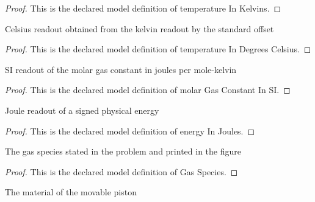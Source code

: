\begin{proof}
  This is the declared model definition of temperature In Kelvins.
\end{proof}
\begin{definition}
  \label{def:physics:phyx-mini-0407:phyxminiproblems-problemphyxmini0407-temperatureindegreescelsius}
  Celsius readout obtained from the kelvin readout by the standard offset
\end{definition}
\begin{proof}
  This is the declared model definition of temperature In Degrees Celsius.
\end{proof}
\begin{definition}
  \label{def:physics:phyx-mini-0407:phyxminiproblems-problemphyxmini0407-molargasconstantinsi}
  SI readout of the molar gas constant in joules per mole-kelvin
\end{definition}
\begin{proof}
  This is the declared model definition of molar Gas Constant In SI.
\end{proof}
\begin{definition}
  \label{def:physics:phyx-mini-0407:phyxminiproblems-problemphyxmini0407-energyinjoules}
  Joule readout of a signed physical energy
\end{definition}
\begin{proof}
  This is the declared model definition of energy In Joules.
\end{proof}
\begin{definition}
  \label{def:physics:phyx-mini-0407:phyxminiproblems-problemphyxmini0407-gasspecies}
  The gas species stated in the problem and printed in the figure
\end{definition}
\begin{proof}
  This is the declared model definition of Gas Species.
\end{proof}
\begin{definition}
  \label{def:physics:phyx-mini-0407:phyxminiproblems-problemphyxmini0407-pistonmaterial}
  The material of the movable piston
\end{definition}
